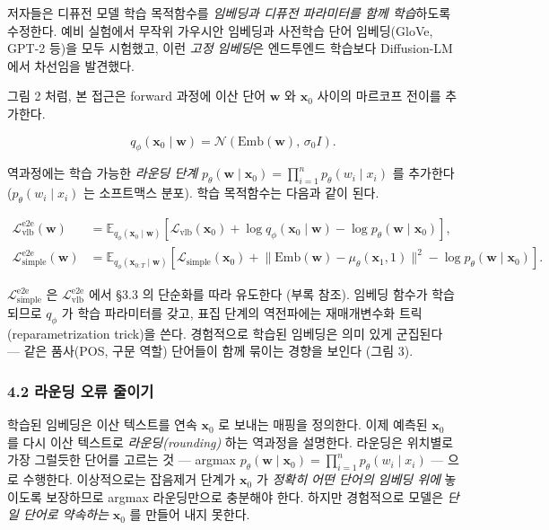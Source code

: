 \documentclass[
]{article}
\begin{document}
저자들은 디퓨전 모델 학습 목적함수를 \emph{임베딩과 디퓨전 파라미터를
함께 학습}하도록 수정한다. 예비 실험에서 무작위 가우시안 임베딩과
사전학습 단어 임베딩(GloVe, GPT-2 등)을 모두 시험했고, 이런 \emph{고정
임베딩}은 엔드투엔드 학습보다 Diffusion-LM 에서 차선임을 발견했다.

그림 2 처럼, 본 접근은 forward 과정에 이산 단어 \(\mathbf{w}\) 와
\(\mathbf{x}_0\) 사이의 마르코프 전이를 추가한다.

\[
q_\phi(\mathbf{x}_0 \mid \mathbf{w}) = \mathcal{N}(\mathrm{Emb}(\mathbf{w}),\, \sigma_0 I).
\]

역과정에는 학습 가능한 \emph{라운딩 단계}
\(p_\theta(\mathbf{w} \mid \mathbf{x}_0) = \prod_{i=1}^{n} p_\theta(w_i \mid x_i)\)
를 추가한다 (\(p_\theta(w_i \mid x_i)\) 는 소프트맥스 분포). 학습
목적함수는 다음과 같이 된다.

\[
\begin{aligned}
\mathcal{L}^\text{e2e}_\text{vlb}(\mathbf{w}) &= \mathbb{E}_{q_\phi(\mathbf{x}_0 \mid \mathbf{w})}\!\left[\mathcal{L}_\text{vlb}(\mathbf{x}_0) + \log q_\phi(\mathbf{x}_0 \mid \mathbf{w}) - \log p_\theta(\mathbf{w} \mid \mathbf{x}_0)\right], \\
\mathcal{L}^\text{e2e}_\text{simple}(\mathbf{w}) &= \mathbb{E}_{q_\phi(\mathbf{x}_{0:T} \mid \mathbf{w})}\!\left[\mathcal{L}_\text{simple}(\mathbf{x}_0) + \big\|\mathrm{Emb}(\mathbf{w}) - \mu_\theta(\mathbf{x}_1, 1)\big\|^2 - \log p_\theta(\mathbf{w} \mid \mathbf{x}_0)\right].
\end{aligned}
\]

\(\mathcal{L}^\text{e2e}_\text{simple}\) 은
\(\mathcal{L}^\text{e2e}_\text{vlb}\) 에서 §3.3 의 단순화를 따라
유도한다 (부록 참조). 임베딩 함수가 학습되므로 \(q_\phi\) 가 학습
파라미터를 갖고, 표집 단계의 역전파에는 재매개변수화
트릭(reparametrization trick)을 쓴다. 경험적으로 학습된 임베딩은 의미
있게 군집된다 --- 같은 품사(POS, 구문 역할) 단어들이 함께 묶이는 경향을
보인다 (그림 3).

\hypertarget{uxb77cuxc6b4uxb529-uxc624uxb958-uxc904uxc774uxae30}{%
\subsubsection{4.2 라운딩 오류
줄이기}\label{uxb77cuxc6b4uxb529-uxc624uxb958-uxc904uxc774uxae30}}

학습된 임베딩은 이산 텍스트를 연속 \(\mathbf{x}_0\) 로 보내는 매핑을
정의한다. 이제 예측된 \(\mathbf{x}_0\) 를 다시 이산 텍스트로
\emph{라운딩(rounding)} 하는 역과정을 설명한다. 라운딩은 위치별로 가장
그럴듯한 단어를 고르는 것 --- argmax
\(p_\theta(\mathbf{w} \mid \mathbf{x}_0) = \prod_{i=1}^{n} p_\theta(w_i \mid x_i)\)
--- 으로 수행한다. 이상적으로는 잡음제거 단계가 \(\mathbf{x}_0\) 가
\emph{정확히 어떤 단어의 임베딩 위에} 놓이도록 보장하므로 argmax
라운딩만으로 충분해야 한다. 하지만 경험적으로 모델은 \emph{단일 단어로
약속하는} \(\mathbf{x}_0\) 를 만들어 내지 못한다.
\end{document}
